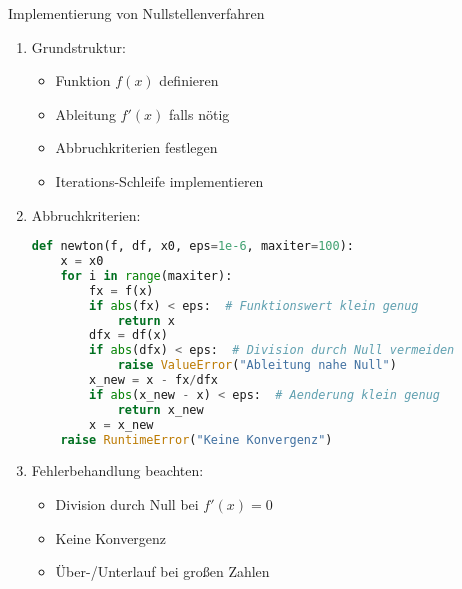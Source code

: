 \begin{KR}{Implementierung von Nullstellenverfahren}
\begin{enumerate}
    \item Grundstruktur:
    \begin{itemize}
        \item Funktion $f(x)$ definieren
        \item Ableitung $f'(x)$ falls nötig
        \item Abbruchkriterien festlegen
        \item Iterations-Schleife implementieren
    \end{itemize}
    
    \item Abbruchkriterien:
    \begin{lstlisting}[language=Python, style=base]
def newton(f, df, x0, eps=1e-6, maxiter=100):
    x = x0
    for i in range(maxiter):
        fx = f(x)
        if abs(fx) < eps:  # Funktionswert klein genug
            return x
        dfx = df(x)
        if abs(dfx) < eps:  # Division durch Null vermeiden
            raise ValueError("Ableitung nahe Null")
        x_new = x - fx/dfx
        if abs(x_new - x) < eps:  # Aenderung klein genug
            return x_new
        x = x_new
    raise RuntimeError("Keine Konvergenz")
    \end{lstlisting}
    
    \item Fehlerbehandlung beachten:
    \begin{itemize}
        \item Division durch Null bei $f'(x) = 0$
        \item Keine Konvergenz
        \item Über-/Unterlauf bei großen Zahlen
    \end{itemize}
\end{enumerate}
\end{KR}

